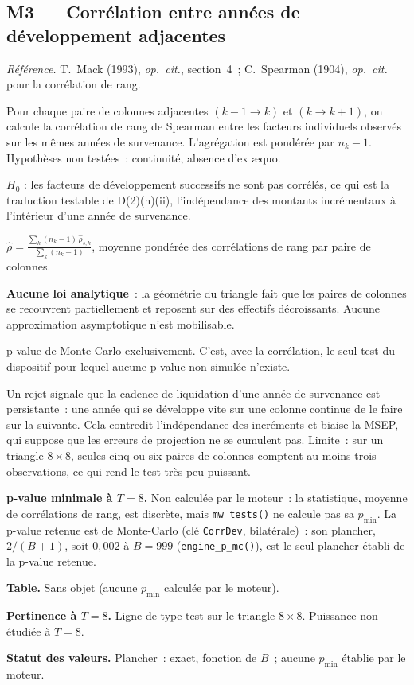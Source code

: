 \documentclass[a4paper,11pt]{article}
\newcommand{\code}[1]{\texttt{\small #1}}
\newcommand{\refl}[1]{{\small\textcolor{maincolor!70!black}{\textit{Référence.} #1}}\par\smallskip}
\newcounter{ficheid}
\newenvironment{fiche}[1]{%
  \stepcounter{ficheid}%
  \phantomsection
  \subsection{#1}%
  \label{fiche:\theficheid}%
}{%
  \end{description}\vspace{0.5em}%
}
\newcommand{\Cadre}{%
  \begin{description}[leftmargin=0pt, style=unboxed, itemsep=3pt, topsep=3pt, parsep=2pt]%
  \item[\textcolor{financeblue}{\textbf{1. Cadre, notations et hypothèses de validité (non testées).}}]}
\newcommand{\Hzero}{\item[\textcolor{financeblue}{\textbf{2. Hypothèse nulle.}}]}
\newcommand{\Stat}{\item[\textcolor{financeblue}{\textbf{3. Statistique de test.}}]}
\newcommand{\Loi}{\item[\textcolor{financeblue}{\textbf{4. Loi sous $H_0$.}}]}
\newcommand{\Pval}{\item[\textcolor{financeblue}{\textbf{5. p-value.}}]}
\newcommand{\Usage}{\item[\textcolor{financeblue}{\textbf{6. Usage et limites.}}]}
\newcommand{\Pertinence}{\item[\textcolor{financeblue}{\textbf{7. Pertinence et puissance à faible $T$.}}]}
\begin{document}
\begin{fiche}{M3 --- Corrélation entre années de développement adjacentes}
\label{mw:m3cor}
\refl{T.~Mack (1993), \emph{op.\ cit.}, section~4~; C.~Spearman (1904),
\emph{op.\ cit.} pour la corrélation de rang.}
\Cadre
Pour chaque paire de colonnes adjacentes $(k-1 \to k)$ et $(k \to k+1)$, on
calcule la corrélation de rang de Spearman entre les facteurs individuels
observés sur les mêmes années de survenance. L'agrégation est pondérée par
$n_k - 1$. Hypothèses non testées~: continuité, absence d'ex \ae quo.
\Hzero
$H_0$ : les facteurs de développement successifs ne sont pas corrélés, ce qui
est la traduction testable de D(2)(h)(ii), l'indépendance des montants
incrémentaux à l'intérieur d'une année de survenance.
\Stat
$\displaystyle \hat\rho = \frac{\sum_k (n_k-1)\,\hat\rho_{s,k}}{\sum_k (n_k-1)}$,
moyenne pondérée des corrélations de rang par paire de colonnes.
\Loi
\textbf{Aucune loi analytique}~: la géométrie du triangle fait que les paires de
colonnes se recouvrent partiellement et reposent sur des effectifs décroissants.
Aucune approximation asymptotique n'est mobilisable.
\Pval
p-value de Monte-Carlo exclusivement. C'est, avec la corrélation, le seul test
du dispositif pour lequel aucune p-value non simulée n'existe.
\Usage
Un rejet signale que la cadence de liquidation d'une année de survenance est
persistante~: une année qui se développe vite sur une colonne continue de le
faire sur la suivante. Cela contredit l'indépendance des incréments et biaise la
MSEP, qui suppose que les erreurs de projection ne se cumulent pas. Limite~: sur
un triangle $8\times8$, seules cinq ou six paires de colonnes comptent au moins
trois observations, ce qui rend le test très peu puissant.
\Pertinence
\textbf{p-value minimale à $T = 8$.} Non calculée par le moteur~: la statistique, moyenne de corrélations de rang, est discrète, mais \code{mw\_tests()} ne calcule pas sa $p_{\min}$. La p-value retenue est de Monte-Carlo (clé \code{CorrDev}, bilatérale)~: son plancher, $2/(B+1)$, soit $0{,}002$ à $B = 999$ (\code{engine\_p\_mc()}), est le seul plancher établi de la p-value retenue.

\textbf{Table.} Sans objet (aucune $p_{\min}$ calculée par le moteur).

\textbf{Pertinence à $T = 8$.} Ligne de type test sur le triangle $8\times 8$. Puissance non étudiée à $T = 8$.

\textbf{Statut des valeurs.} Plancher~: exact, fonction de $B$~; aucune $p_{\min}$ établie par le moteur.
\end{fiche}
\end{document}
